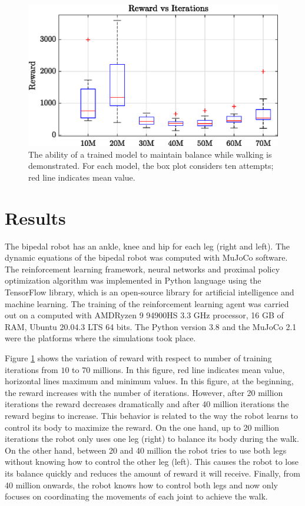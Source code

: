 \begin{figure}
	\centering
	\includegraphics{images/reward_vs_iter.eps}
	\caption{The ability of a trained model to maintain balance while walking is demonstrated. For each model, the box plot considers ten attempts; red line indicates mean value.}
	\label{fig:boxplot}
\end{figure}

\section{Results}
The bipedal robot has an ankle, knee and hip for each leg (right and left). The dynamic equations of the bipedal robot was computed with MuJoCo software. The reinforcement learning framework,  neural networks and proximal policy optimization algorithm was implemented in Python language using the TensorFlow library, which is an open-source library for artificial intelligence and machine learning. The training of the reinforcement learning agent was carried out on a computed with AMD\textregistered Ryzen 9 94900HS 3.3 GHz processor, 16 GB of RAM, Ubuntu 20.04.3 LTS 64 bits. The Python version 3.8 and the MuJoCo 2.1 were the platforms where the simulations took place.

Figure \ref{fig:boxplot} shows the variation of reward with respect to number of training iterations from $10$ to $70$ millions. In this figure, red line indicates mean value, horizontal lines maximum and minimum values. In this figure, at the beginning, the reward increases with the number of iterations. However, after 20 million iterations the reward decreases dramatically and after 40 million iterations the reward begins to increase. This behavior is related to the way the robot learns to control its body to maximize the reward. On the one hand, up to 20 million iterations the robot only uses one leg (right) to balance its body during the walk. On the other hand, between 20 and 40 million the robot tries to use both legs without knowing how to control the other leg (left). This causes the robot to lose its balance quickly and reduces the amount of reward it will receive. Finally, from 40 million onwards, the robot knows how to control both legs and now only focuses on coordinating the movements of each joint to achieve the walk.




